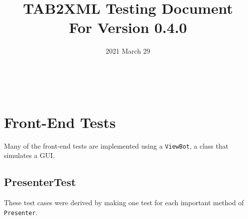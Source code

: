 \documentclass[11pt]{article}
\date{2021 March 29}
\title{TAB2XML Testing Document\\\medskip
\large For Version 0.4.0}
\begin{document}
\maketitle
\tableofcontents

\newpage\\
\section{Front-End Tests}
\label{sec:org76be226}
Many of the front-end tests are implemented using a \texttt{ViewBot}, a class that simulates a GUI.\\
\subsection{PresenterTest}
\label{sec:org7179daf}
These test cases were derived by making one test for each important method of \texttt{Presenter}.\\
\end{document}
